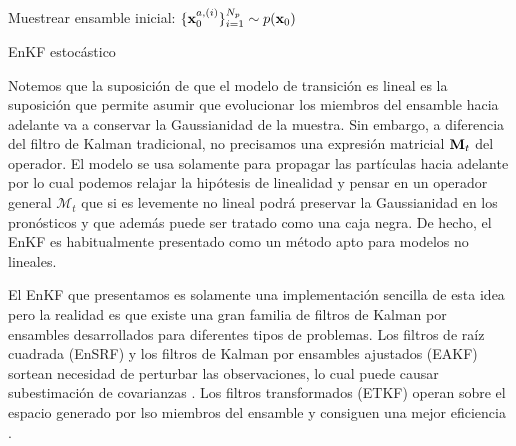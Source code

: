 \begin{algorithm}[H]\label{algo:enkf_pert_obs}
    Muestrear ensamble inicial: $\{\mathbf{x}_0^{a, (i)} \}_{i=1}^{N_p} \sim p(\mathbf{x}_0)$
    
\caption{EnKF estocástico}
\end{algorithm}

Notemos que la suposición de que el modelo de transición es lineal es la suposición que permite asumir que evolucionar los miembros del ensamble hacia adelante va a conservar la Gaussianidad de la muestra. Sin embargo, a diferencia del filtro de Kalman tradicional, no precisamos una expresión matricial $\mathbf{M}_t$ del operador. El modelo se usa solamente para propagar las partículas hacia adelante por lo cual podemos relajar la hipótesis de linealidad y pensar en un operador general $\mathcal{M}_t$ que si es levemente no lineal podrá preservar la Gaussianidad en los pronósticos y que además puede ser tratado como una caja negra. De hecho, el EnKF es habitualmente presentado como un método apto para modelos no lineales.

El EnKF que presentamos es solamente una implementación sencilla de esta idea pero la realidad es que existe una gran familia de filtros de Kalman por ensambles desarrollados para diferentes tipos de problemas. Los filtros de raíz cuadrada (EnSRF) y los filtros de Kalman por ensambles ajustados (EAKF) sortean necesidad de perturbar las observaciones, lo cual puede causar subestimación de covarianzas \citep{Whitaker2002, Anderson2001}. Los filtros transformados (ETKF) operan sobre el espacio generado por lso miembros del ensamble y consiguen una mejor eficiencia \citep{Bishop2001}.

